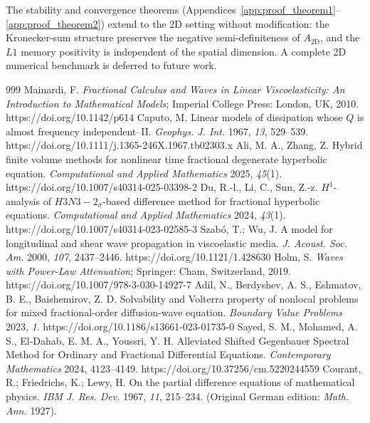 \documentclass[a4paper,fleqn]{cas-sc}
\begin{document}
\begin{appendix}
The stability and convergence theorems (Appendices~\ref{app:proof_theorem1}--\ref{app:proof_theorem2}) extend to the 2D setting without modification: the Kronecker-sum structure preserves the negative semi-definiteness of $A_{\mathrm{2D}}$, and the $L1$ memory positivity is independent of the spatial dimension. A complete 2D numerical benchmark is deferred to future work.

\end{appendix}



\renewcommand{\refname}{References}
\begin{thebibliography}{999}
 Mainardi, F. \textit{Fractional Calculus and Waves in Linear Viscoelasticity: An Introduction to Mathematical Models}; Imperial College Press: London, UK, 2010. https://doi.org/10.1142/p614
 Caputo, M. Linear models of dissipation whose $Q$ is almost frequency independent--II.  \textit{Geophys. J. Int.} 1967, \textit{13}, 529--539. https://doi.org/10.1111/j.1365-246X.1967.tb02303.x
 Ali, M. A., Zhang, Z. Hybrid finite volume methods for nonlinear time fractional degenerate hyperbolic equation. \textit{Computational and Applied Mathematics} 2025, \textit{45}(1). https://doi.org/10.1007/s40314-025-03398-2
 Du, R.-l., Li, C., Sun, Z.-z. $H^1$-analysis of $H3N3-2_\sigma$-based difference method for fractional hyperbolic equations. \textit{Computational and Applied Mathematics} 2024, \textit{43}(1). https://doi.org/10.1007/s40314-023-02585-3
 Szab\'o, T.; Wu, J. A model for longitudinal and shear wave propagation in viscoelastic media. \textit{J. Acoust. Soc. Am.} 2000, \textit{107}, 2437--2446. https://doi.org/10.1121/1.428630
 Holm, S. \textit{Waves with Power-Law Attenuation}; Springer: Cham, Switzerland, 2019. https://doi.org/10.1007/978-3-030-14927-7
 Adil, N., Berdyshev, A. S., Eshmatov, B. E., Baishemirov, Z. D. Solvability and Volterra property of nonlocal problems for mixed fractional-order diffusion-wave equation. \textit{Boundary Value Problems} 2023, \textit{1}. https://doi.org/10.1186/s13661-023-01735-0
 Sayed, S. M., Mohamed, A. S., El-Dahab, E. M. A., Youssri, Y. H. Alleviated Shifted Gegenbauer Spectral Method for Ordinary and Fractional Differential Equations. \textit{Contemporary Mathematics} 2024, 4123--4149. https://doi.org/10.37256/cm.5220244559
 Courant, R.; Friedrichs, K.; Lewy, H. On the partial difference equations of mathematical physics. \textit{IBM J. Res. Dev.} 1967, \textit{11}, 215--234. (Original German edition: \textit{Math. Ann.} 1927).

\end{thebibliography}
\end{document}
